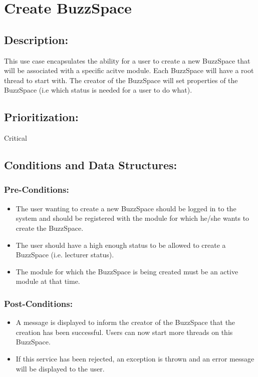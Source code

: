 \documentclass[a4paper,11pt]{article}
\begin{document}
\section{Create BuzzSpace}
\subsection*{Description:}This use case encapsulates the ability for a user to create a new BuzzSpace that will be associated with a specific acitve module. 
Each BuzzSpace will have a root thread to start with. The creator of the BuzzSpace will set properties of the BuzzSpace (i.e which status is needed for a user 
to do what). 
\subsection{Prioritization:}Critical
\subsection{Conditions and Data Structures:}
\subsubsection*{Pre-Conditions:}
\begin{itemize}
	\item The user wanting to create a new BuzzSpace should be logged in to the system and should be registered with the module for which he/she wants to
	create the BuzzSpace. 
	\item The user should have a high enough status to be allowed to create a BuzzSpace (i.e. lecturer status).
	\item The module for which the BuzzSpace is being created must be an active module at that time.
\end{itemize}
\subsubsection*{Post-Conditions:}
\begin{itemize}
	\item A message is displayed to inform the creator of the BuzzSpace that the creation has been successful. Users can now start more threads on this BuzzSpace.
	\item If this service has been rejected, an exception is thrown and an error message will be displayed to the user.
\end{itemize}
\end{document}
